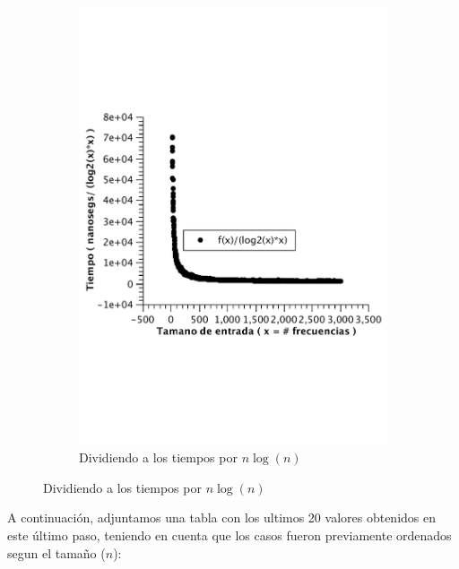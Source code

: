 \begin{figure}[H]
        \centering
        \begin{subfigure}[b]{0.5\textwidth}
                \includegraphics[width=\textwidth]{imagenes/af-rand-const.pdf}
                \caption*{Dividiendo a los tiempos por $n \log(n)$}
        \end{subfigure}
\end{figure}


A continuación, adjuntamos una tabla con los ultimos 20 valores obtenidos en este último paso, teniendo en cuenta que los casos fueron previamente ordenados segun el tamaño ($n$):

